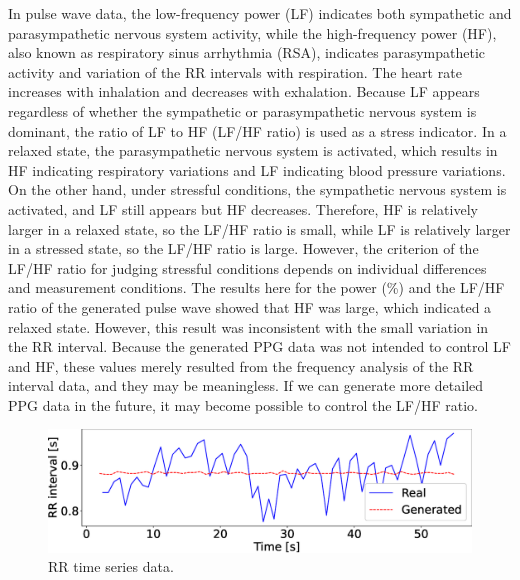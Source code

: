 \documentclass{ieeeaccess}
\begin{document}
In pulse wave data, the low-frequency power (LF) indicates both sympathetic and parasympathetic nervous system activity, while the high-frequency power (HF), also known as respiratory sinus arrhythmia (RSA), indicates parasympathetic activity and variation of the RR intervals with respiration. The heart rate increases with inhalation and decreases with exhalation. Because LF appears regardless of whether the sympathetic or parasympathetic nervous system is dominant, the ratio of LF to HF (LF/HF ratio) is used as a stress indicator. In a relaxed state, the parasympathetic nervous system is activated, which results in HF indicating respiratory variations and LF indicating blood pressure variations. On the other hand, under stressful conditions, the sympathetic nervous system is activated, and LF still appears but HF decreases. Therefore, HF is relatively larger in a relaxed state, so the LF/HF ratio is small, while LF is relatively larger in a stressed state, so the LF/HF ratio is large. However, the criterion of the LF/HF ratio for judging stressful conditions depends on individual differences and measurement conditions. The results here for the power (\%) and the LF/HF ratio of the generated pulse wave showed that HF was large, which indicated a relaxed state. However, this result was inconsistent with the small variation in the RR interval. Because the generated PPG data was not intended to control LF and HF, these values merely resulted from the frequency analysis of the RR interval data, and they may be meaningless. If we can generate more detailed PPG data in the future, it may become possible to control the LF/HF ratio.

\begin{figure}[!t]
  \centering
  \includegraphics[width=1\linewidth]{figures/rr_wave.eps}
  \caption{RR time series data.}
  \label{fig:rr_wave}
\end{figure}
\end{document}

